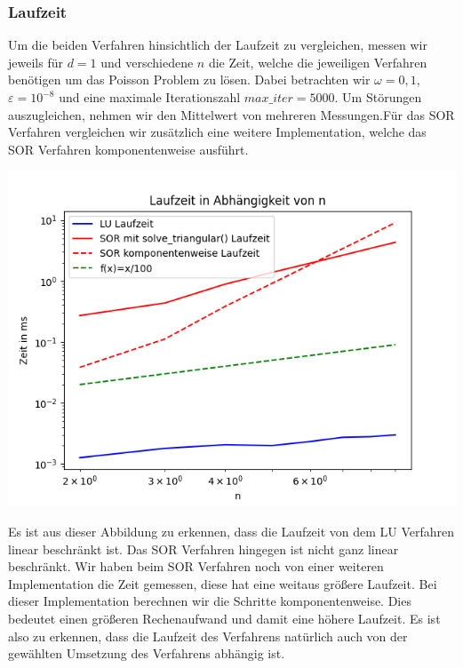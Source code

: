 \documentclass[smallheadings]{scrartcl}
\theoremstyle{definition}
\begin{document}
\subsubsection{Laufzeit}
Um die beiden Verfahren hinsichtlich der Laufzeit zu vergleichen,  messen wir jeweils für $d=1$ und verschiedene $n$ die Zeit, welche die jeweiligen Verfahren benötigen um das Poisson Problem zu lösen.  Dabei betrachten wir $\omega =0,1$, $\varepsilon = 10^{-8}$ und eine maximale Iterationszahl $max\_ iter = 5000$.  Um Störungen auszugleichen,  nehmen wir den Mittelwert von mehreren Messungen.Für das SOR Verfahren vergleichen wir zusätzlich eine weitere Implementation,  welche das SOR Verfahren komponentenweise ausführt. 


\begin{minipage}{\textwidth}

 \centering
 \includegraphics[scale = 0.9]{time1}
 	\label{time}

 \end{minipage}

Es ist aus dieser Abbildung zu erkennen, dass die Laufzeit von dem LU Verfahren linear beschränkt ist.  Das SOR Verfahren hingegen ist nicht ganz linear beschränkt.  Wir haben beim SOR Verfahren noch von einer weiteren Implementation die Zeit gemessen, diese hat eine weitaus größere Laufzeit. Bei dieser Implementation berechnen wir die Schritte komponentenweise. Dies bedeutet einen größeren Rechenaufwand und damit eine höhere Laufzeit. Es ist also zu erkennen, dass die Laufzeit des Verfahrens natürlich auch 
von der gewählten Umsetzung des Verfahrens abhängig ist. 
\end{document}
